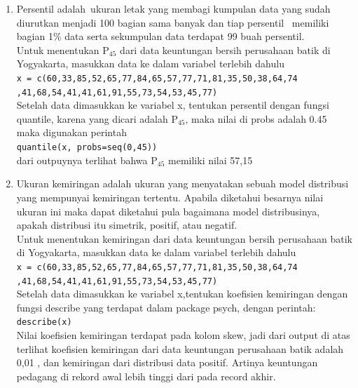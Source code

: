 \documentclass[a4paper,12pt]{article}
\begin{document}
\begin{enumerate}[label=\alph*.]
	\item Persentil adalah ukuran letak yang membagi kumpulan data yang sudah diurutkan menjadi 100 bagian sama banyak dan tiap persentil  memiliki bagian 1\% data serta sekumpulan data terdapat 99 buah persentil.\\
	Untuk menentukan P$_{45}$ dari data keuntungan bersih perusahaan batik di Yogyakarta, masukkan data ke dalam variabel terlebih dahulu\\
	\texttt{x = c(60,33,85,52,65,77,84,65,57,77,71,81,35,50,38,64,74\\,41,68,54,41,41,61,91,55,73,54,53,45,77)\\}
	Setelah data dimasukkan ke variabel x, tentukan persentil dengan fungsi quantile, karena yang dicari adalah P$_{45}$, maka nilai di probs adalah 0.45 maka digunakan perintah\\
	\texttt{quantile(x, probs=seq(0,45))\\}
	dari outpuynya terlihat bahwa P$_{45}$ memiliki nilai 57,15
	
	\item Ukuran kemiringan adalah ukuran yang menyatakan sebuah model distribusi yang mempunyai kemiringan tertentu. Apabila diketahui besarnya nilai ukuran ini maka dapat diketahui pula bagaimana model distribusinya, apakah distribusi itu simetrik, positif, atau negatif.\\
	Untuk menentukan kemiringan dari data keuntungan bersih perusahaan batik di Yogyakarta, masukkan data ke dalam variabel terlebih dahulu\\
	\texttt{x = c(60,33,85,52,65,77,84,65,57,77,71,81,35,50,38,64,74\\,41,68,54,41,41,61,91,55,73,54,53,45,77)\\}
	Setelah data dimasukkan ke variabel x,tentukan koefisien kemiringan dengan fungsi describe yang terdapat dalam package psych, dengan perintah:\\
	\texttt{describe(x)}\\
	Nilai koefisien kemiringan terdapat pada kolom skew, jadi dari output di atas terlihat koefisien kemiringan dari data keuntungan perusahaan batik adalah 0,01 , dan kemiringan dari distribusi data positif. Artinya keuntungan pedagang  di rekord awal lebih tinggi dari pada record akhir.
	

\end{enumerate}
\end{document}
